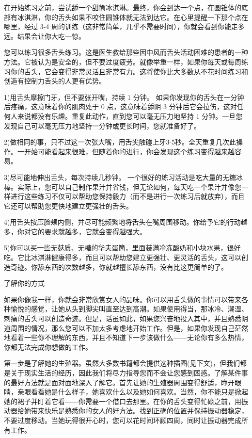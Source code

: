 \documentclass[12pt,UTF8]{ctexbook}
\begin{document}
在开始练习之前，尝试舔一个甜筒冰淇淋。最终，你会到达一个点，在圆锥体的底部有冰淇淋，你的舌头如果不咬住圆锥体就无法到达它。在心里提醒一下那个点在哪里，经过 3-4 周的训练（这非常简单，几乎不需要时间），你就会看到你能走多远。结果会让你大吃一惊。

您可以练习很多舌头练习。这是医生教给那些因中风而舌头活动困难的患者的一种方法。它被认为是安全的，但不要过度疲劳。就像举重一样，如果你每天或每周练习你的舌头，它会变得非常灵活且非常有力。这将使你比大多数从不花时间练习和创造有控制力舌头的人更有优势。

1)用舌头摩擦门牙，但不要张开嘴，持续 1 分钟。 如果你发现你的舌头在一分钟后疼痛，这意味着你的肌肉处于 0 点，这意味着舔阴 3 分钟后它会拉伤，这对任何人来说都没有乐趣。重复此动作，直到您可以毫无压力地坚持 1 分钟。一旦您发现自己可以毫无压力地坚持一分钟或更长时间，您就准备好了。

2)做相同的事，只不过这一次张大嘴，用舌尖触碰上牙3-5秒。全天重复几次此操作。一开始可能看起来很难，但随着你的进行，你会发现这个练习变得越来越容易。

3)尽可能地伸出舌头，每次持续几秒钟。 一个很好的练习活动是吃大量的无糖冰棒。实际上，您可以自己制作果汁并省钱，但无论如何，每天吃一个果汁并像您一样进行这些练习不仅可以帮助您保持毅力（而不是进行一次练习后就放弃），而且它还可以帮助您更快地建立更强壮的舌头。

4)用舌头按压脸颊内侧，并尽可能频繁地将舌头在嘴周围移动。你给予它的行动越多，你对它的要求就越多，它就会变得越强大。

5)你可以买一些无麸质、无糖的华夫蛋筒，里面装满冷冻酸奶和小块水果，很好吃。它比冰淇淋健康得多，而且可以帮助您建立更强壮、更灵活的舌头，这可以创造奇迹。你舔东西的次数越多，你就越擅长舔东西，没有比这更简单的了。

了解你的方式

如果你像我一样，你就会非常欣赏女人的品味。你可以用舌头做的事情可以带来各种愉悦的感觉，让她从头到脚尖叫直至达到高潮。如果使用得当，那冰冷、潮湿、刺痛的舌头可以创造奇迹。但是，话虽如此，如果您兴奋地投入其中，并且熟悉阴道周围的情况，那么您可以不加太多考虑地开始工作。但是，如果你发现自己茫然地看着一些你不理解的东西，并且不知道下一步该做什么——无论你有多么热情，你都无法完成你想做的工作。

第一步是了解她的生殖器。虽然大多数书籍都会提供这种插图(见下文)，但我们都是关于现实生活的经历，因此我们将尽力指导您而不会让您感到困惑。了解某件事的最好方法就是面对面地深入了解它。首先让她的生殖器周围变得舒适，睁开眼睛，亲眼看看她是什么样子，她喜欢什么以及她如何喜欢。当然，你不能只是掀起她的裙子并盯着它看——你需要一个借口去那里。在你的舌头变得忙碌之前，用振动器给她带来快乐是熟悉你的女人的好方法。找到正确的位置并保持振动器稳定，不要过度移动。当她玩得很开心时，您可以花时间环顾四周，同时让振动器完成所有工作。
\end{document}
